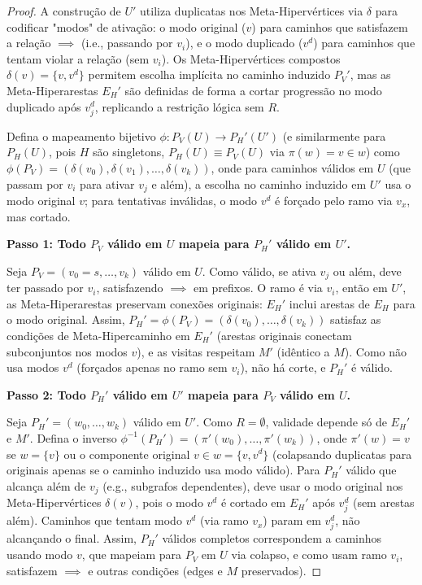 \documentclass{article}
\begin{document}
\begin{proof}
A construção de \( U' \) utiliza duplicatas nos Meta-Hipervértices via \( \delta \) para codificar "modos" de ativação: o modo original (\( v \)) para caminhos que satisfazem a relação \( \implies \) (i.e., passando por \( v_i \)), e o modo duplicado (\( v^d \)) para caminhos que tentam violar a relação (sem \( v_i \)). Os Meta-Hipervértices compostos \( \delta(v) = \{v, v^d\} \) permitem escolha implícita no caminho induzido \( P_V' \), mas as Meta-Hiperarestas \( E_H' \) são definidas de forma a cortar progressão no modo duplicado após \( v_j^d \), replicando a restrição lógica sem \( R \).

Defina o mapeamento bijetivo \( \phi: P_V(U) \to P_H'(U') \) (e similarmente para \( P_H(U) \), pois \( H \) são singletons, \( P_H(U) \equiv P_V(U) \) via \( \pi(w) = v \in w \)) como \( \phi(P_V) = (\delta(v_0), \delta(v_1), \dots, \delta(v_k)) \), onde para caminhos válidos em \( U \) (que passam por \( v_i \) para ativar \( v_j \) e além), a escolha no caminho induzido em \( U' \) usa o modo original \( v \); para tentativas inválidas, o modo \( v^d \) é forçado pelo ramo via \( v_x \), mas cortado.

\textbf{Passo 1: Todo \( P_V \) válido em \( U \) mapeia para \( P_H' \) válido em \( U' \).}

Seja \( P_V = (v_0 = s, \dots, v_k) \) válido em \( U \). Como válido, se ativa \( v_j \) ou além, deve ter passado por \( v_i \), satisfazendo \( \implies \) em prefixos. O ramo é via \( v_i \), então em \( U' \), as Meta-Hiperarestas preservam conexões originais: \( E_H' \) inclui arestas de \( E_H \) para o modo original. Assim, \( P_H' = \phi(P_V) = (\delta(v_0), \dots, \delta(v_k)) \) satisfaz as condições de Meta-Hipercaminho em \( E_H' \) (arestas originais conectam subconjuntos nos modos \( v \)), e as visitas respeitam \( M' \) (idêntico a \( M \)). Como não usa modos \( v^d \) (forçados apenas no ramo sem \( v_i \)), não há corte, e \( P_H' \) é válido.

\textbf{Passo 2: Todo \( P_H' \) válido em \( U' \) mapeia para \( P_V \) válido em \( U \).}

Seja \( P_H' = (w_0, \dots, w_k) \) válido em \( U' \). Como \( R = \emptyset \), validade depende só de \( E_H' \) e \( M' \). Defina o inverso \( \phi^{-1}(P_H') = (\pi'(w_0), \dots, \pi'(w_k)) \), onde \( \pi'(w) = v \) se \( w = \{v\} \) ou o componente original \( v \in w = \{v, v^d\} \) (colapsando duplicatas para originais apenas se o caminho induzido usa modo válido). Para \( P_H' \) válido que alcança além de \( v_j \) (e.g., subgrafos dependentes), deve usar o modo original nos Meta-Hipervértices \( \delta(v) \), pois o modo \( v^d \) é cortado em \( E_H' \) após \( v_j^d \) (sem arestas além). Caminhos que tentam modo \( v^d \) (via ramo \( v_x \)) param em \( v_j^d \), não alcançando o final. Assim, \( P_H' \) válidos completos correspondem a caminhos usando modo \( v \), que mapeiam para \( P_V \) em \( U \) via colapso, e como usam ramo \( v_i \), satisfazem \( \implies \) e outras condições (edges e \( M \) preservados).
\newpage


\end{proof}
\end{document}
